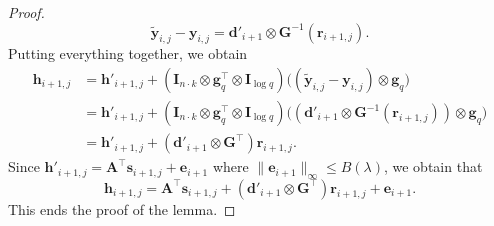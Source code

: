 \documentclass{theoretics}
\renewcommand{\sec}{\ensuremath{\lambda}}
\newcommand{\id}{\ensuremath{\mathbf{I}}}
\begin{document}
\begin{proof}
\[ \tilde{\mathbf{y}}_{i,j}-\mathbf{y}_{i,j} =\mathbf{d}'_{i+1}\otimes \mathbf{G}^{-1}(\mathbf{r}_{i+1,j}). \]
Putting everything together, we obtain
\begin{align}
\mathbf{h}_{i+1,j}
&=\mathbf{h}'_{i+1,j}
+(\id_{n\cdot k}\otimes \mathbf g_q^\intercal\otimes \id_{\log q})\bigl((\tilde{\mathbf{y}}_{i,j}-\mathbf y_{i,j})\otimes \mathbf g_q\bigr)\nonumber\\
&=\mathbf{h}'_{i+1,j}
+(\id_{n\cdot k}\otimes \mathbf g_q^\intercal\otimes \id_{\log q})
\bigl((\mathbf d'_{i+1}\otimes \mathbf G^{-1}(\mathbf r_{i+1,j}))\otimes \mathbf g_q\bigr)\nonumber\\
&=\mathbf{h}'_{i+1,j}+(\mathbf d'_{i+1}\otimes \mathbf G^\intercal)\mathbf r_{i+1,j}.\label{eqclaimboh}
\end{align}
Since $\mathbf{h}'_{i+1,j}=\mathbf{A}^\intercal \mathbf{s}_{i+1,j}+\mathbf e_{i+1}$ where $\lVert \mathbf{e}_{i+1}\rVert_\infty\le B(\sec)$, we obtain that
\[ \mathbf{h}_{i+1,j}=\mathbf{A}^\intercal \mathbf{s}_{i+1,j}+(\mathbf{d}'_{i+1}\otimes \mathbf{G}^\intercal)\mathbf{r}_{i+1,j}+\mathbf e_{i+1}. \]
This ends the proof of the lemma.
\end{proof}
\end{document}
